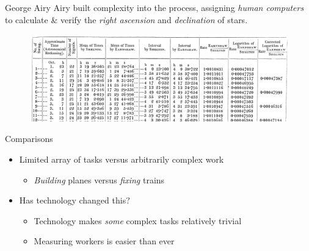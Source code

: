 \documentclass[presentation]{subfiles}
\begin{document}
\begin{frame}{George Airy}
    Airy built complexity into the process, assigning \emph{human computers} 
    to calculate \& verify the \emph{right ascension} and \emph{declination} of stars.

    \begin{figure}
    \includegraphics[width=\textwidth]{figures/complexity/pw_literature/airy.png}
    \end{figure}
\end{frame}






\begin{frame}{Comparisons}
\begin{itemize}
  \item Limited array of tasks versus arbitrarily complex work
  \begin{itemize}
    \item \emph{Building} planes versus \emph{fixing} trains
  \end{itemize}
  \item \normalsize{Has technology changed this?}
    \begin{itemize}
      \item Technology makes \emph{some} complex tasks relatively trivial
      \item Measuring workers is easier than ever
    \end{itemize}
\end{itemize}
\end{frame}
\end{document}
